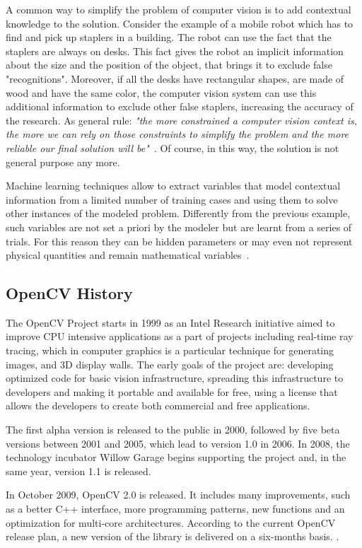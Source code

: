 	A common way to simplify the problem of computer vision is to add contextual knowledge to the solution. 
	Consider the example of a mobile robot which has to find and pick up staplers in a building. The robot can use the fact that the staplers are always on desks. This fact gives the robot an implicit information about the size and the position of the object, that brings it to exclude false "recognitions". Moreover, if all the desks have rectangular shapes, are made of wood and have the same color, the computer vision system can use this additional information to exclude other false staplers, increasing the accuracy of the research. As general rule: \emph{"the more constrained a computer vision context is, the more we can rely on those constraints to simplify the problem and the more reliable our final solution will be"}~\cite[5]{bradski2008learning}. Of course, in this way, the solution is not general purpose any more.
	
	Machine learning techniques allow to extract variables that model contextual information from a limited number of training cases and using them to solve other instances of the modeled problem. 
	Differently from the previous example, such variables are not set a priori by the modeler but are learnt from a series of trials. For this reason they can be hidden parameters or may even not represent physical quantities and remain mathematical variables~\cite{bradski2008learning}.

	\subsection{OpenCV History}
	The \mbox{OpenCV} Project starts in 1999 as an Intel Research initiative aimed to improve CPU intensive applications as a part of projects including real-time ray tracing, which in computer graphics is a particular technique for generating images, and 3D display walls. The early goals of the project are: developing optimized code for basic vision infrastructure, spreading this infrastructure to developers and making it portable and available for free, using a license that allows the developers to create both commercial and free applications.

	The first alpha version is released to the public in 2000, followed by five beta versions between 2001 and 2005, which lead to version 1.0 in 2006. In 2008, the technology incubator Willow Garage begins supporting the project and, in the same year, version 1.1  is released.

	In October 2009, \mbox{OpenCV} 2.0 is released. It includes many improvements, such as a better C++ interface, more programming patterns, new functions and an optimization for multi-core architectures. According to the current \mbox{OpenCV} release plan, a new version of the library is delivered on a six-months basis. \cite{OpenCV:ChangeLogs}.



